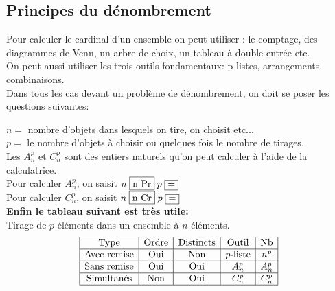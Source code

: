 \subsection{Principes du dénombrement}
Pour calculer le cardinal d'un ensemble on peut utiliser : le comptage, des diagrammes de Venn, un arbre de choix, un tableau à double entrée etc.\\
On peut aussi utiliser les  trois outils fondamentaux:  p-listes,  arrangements,  combinaisons. \\ Dans tous les cas devant un problème de dénombrement, on doit se poser les questions suivantes:
 \begin{center}

\end{center}
 
 $ n= $ nombre d'objets dans lesquels on tire, on choisit etc...\\
  $ p= $  le nombre d'objets à choisir ou quelques fois le nombre de tirages.\\
  
Les $A_{n}^{p} $ et  $C_{n}^{p} $ sont des entiers naturels qu'on peut calculer à l'aide de la calculatrice.\\
 Pour calculer $A_{n}^{p} $, on saisit $ n\; \fbox{n Pr}\; p\;\fbox{=}$\\
 Pour calculer $C_{n}^{p} $, on saisit  $ n\; \fbox{n Cr}\; p\;\fbox{=}$\\

 \textbf{Enfin  le tableau suivant est très utile:}\\
 Tirage de $p$ éléments dans un ensemble à $n$ éléments.
$$
\begin{array}{|c|c|c|c|c|}
\hline
\text{Type} & \text{Ordre} & \text{Distincts} & \text{Outil} & \text{Nb} \\
\hline
\text{Avec remise} & \text{Oui} & \text{Non} & p\text{-liste} & n^p \\
\hline
\text{Sans remise} & \text{Oui} & \text{Oui} & A_n^p & A_n^p \\
\hline
\text{Simultanés} & \text{Non} & \text{Oui} & C_n^p & C_n^p \\
\hline
\end{array}
$$


